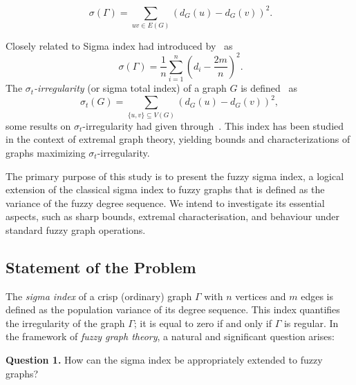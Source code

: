 \documentclass[12pt]{amsart}
\newcommand{\SG}{\sigma(\Gamma)}
\begin{document}
\begin{equation}~\label{eqqsigmawj00}
\SG=\sum_{uv\in E(G)}(d_G(u)-d_G(v))^2.
\end{equation}

Closely related to Sigma index had introduced by~\cite{Criado2014Flores} as
\begin{equation}~\label{eqqsigmawj01}
\SG=\frac{1}{n}\sum_{i=1}^{n}\left( d_i-\frac{2m}{n}\right)^2.
\end{equation}
The \emph{$\sigma_t$-irregularity} (or sigma total index) of a graph $G$ is defined~\cite{Knor2025RQW,Dimitrov2023Stevanović} as
\[
\sigma_t(G) = \sum_{\{u,v\} \subseteq V(G)} (d_G(u)-d_G(v))^2,
\]
some results on $\sigma_ {t} $-irregularity had given through~\cite{Filipovski2024Dimitrov}. This index has been studied in the context of extremal graph theory, yielding bounds and characterizations of graphs maximizing $\sigma_t$-irregularity.


The primary purpose of this study is to present the fuzzy sigma index, a logical extension of the classical sigma index to fuzzy graphs that is defined as the variance of the fuzzy degree sequence. We intend to investigate its essential aspects, such as sharp bounds, extremal characterisation,  and behaviour under standard fuzzy graph operations.




\subsection{Statement of the Problem}

The \textit{sigma index} of a crisp (ordinary) graph $\Gamma$ with $n$ vertices and $m$ edges is defined as the population variance of its degree sequence. This index quantifies the irregularity of the graph $\Gamma$; it is equal to zero if and only if $\Gamma$ is regular.
In the framework of \textit{fuzzy graph theory}, a natural and significant question arises:

\noindent \textbf{Question 1.} How can the sigma index be appropriately extended to fuzzy graphs?
\end{document}
